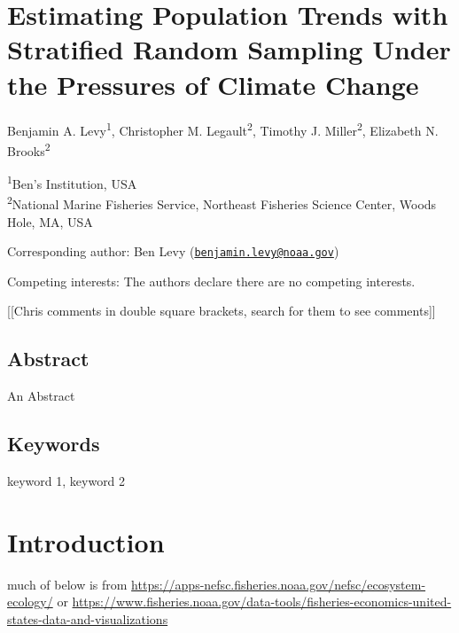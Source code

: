 \documentclass[
  12pt,
]{article}
\author{}
\date{\vspace{-2.5em}}
\begin{document}
\newpage

\hypertarget{estimating-population-trends-with-stratified-random-sampling-under-the-pressures-of-climate-change}{%
\section{Estimating Population Trends with Stratified Random Sampling Under the Pressures of Climate Change}\label{estimating-population-trends-with-stratified-random-sampling-under-the-pressures-of-climate-change}}

Benjamin A. Levy\textsuperscript{1}, Christopher M. Legault\textsuperscript{2}, Timothy J. Miller\textsuperscript{2}, Elizabeth N. Brooks\textsuperscript{2}

\textsuperscript{1}Ben's Institution, USA\\
\textsuperscript{2}National Marine Fisheries Service, Northeast Fisheries Science Center, Woods Hole, MA, USA

Corresponding author: Ben Levy (\href{mailto:benjamin.levy@noaa.gov}{\nolinkurl{benjamin.levy@noaa.gov}})

Competing interests: The authors declare there are no competing interests.

{[}{[}Chris comments in double square brackets, search for them to see comments{]}{]}

\newpage

\hypertarget{abstract}{%
\subsection{Abstract}\label{abstract}}

An Abstract

\hypertarget{keywords}{%
\subsection{Keywords}\label{keywords}}

keyword 1, keyword 2

\newpage

\section{Introduction}

much of below is from \url{https://apps-nefsc.fisheries.noaa.gov/nefsc/ecosystem-ecology/}
or
\url{https://www.fisheries.noaa.gov/data-tools/fisheries-economics-united-states-data-and-visualizations}
\end{document}
